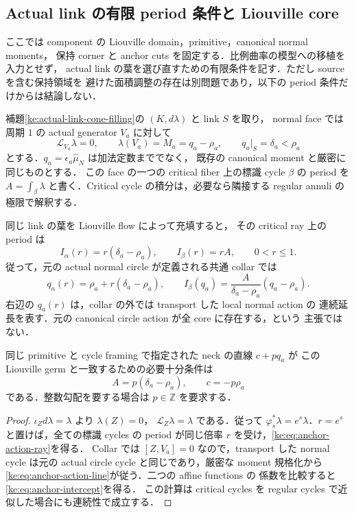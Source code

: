 \subsection{Actual link の有限 period 条件と Liouville core}

ここでは component の Liouville domain，primitive，canonical normal moments，
保持 corner と anchor cuts を固定する．比例曲率の模型への移植を入力とせず，
actual link の葉を選び直すための有限条件を記す．ただし source を含む保持領域を
避けた面積調整の存在は別問題であり，以下の period 条件だけからは結論しない．

\begin{lemma}
\label{ke:anchor-liouville-actions}
補題\ref{ke:actual-link-cone-filling}の $(K,d\lambda)$ と link $S$ を取り，
normal face では周期 $1$ の actual generator $V_a$ に対して
\[
 \mathcal L_{V_a}\lambda=0,\qquad
 \lambda(V_a)=M_a=q_a-\rho_a,\qquad q_a|_S=\delta_a<\rho_a
\]
とする．$q_a=\epsilon_a\widehat\mu_N$ は加法定数まででなく，
既存の canonical moment と厳密に同じものとする．
この face の一つの critical fiber 上の標識 cycle $\beta$ の period を
$A=\int_\beta\lambda$ と書く．Critical cycle の積分は，必要なら隣接する
regular annuli の極限で解釈する．

同じ link の葉を Liouville flow によって充填すると，
その critical ray 上の period は
\begin{equation}\label{ke:eq:anchor-action-ray}
 I_\alpha(r)=r(\delta_a-\rho_a),\qquad I_\beta(r)=rA,
 \qquad 0<r\le1.
\end{equation}
従って，元の actual normal circle が定義される共通 collar では
\begin{equation}\label{ke:eq:anchor-action-line}
 q_a(r)=\rho_a+r(\delta_a-\rho_a),\qquad
 I_\beta(q_a)=\frac{A}{\delta_a-\rho_a}(q_a-\rho_a).
\end{equation}
右辺の $q_a(r)$ は，collar の外では transport した local normal action の
連続延長を表す．元の canonical circle action が全 core に存在する，という
主張ではない．

同じ primitive と cycle framing で指定された neck の直線 $c+pq_a$ が
この Liouville germ と一致するための必要十分条件は
\begin{equation}\label{ke:eq:anchor-intercept}
 A=p(\delta_a-\rho_a),\qquad c=-p\rho_a
\end{equation}
である．整数勾配を要する場合は $p\in\mathbb Z$ を要求する．
\end{lemma}

\begin{proof}
$\iota_Zd\lambda=\lambda$ より $\lambda(Z)=0$，
$\mathcal L_Z\lambda=\lambda$ である．従って
$\varphi_s^*\lambda=e^s\lambda$．$r=e^s$ と置けば，全ての標識 cycles の
period が同じ倍率 $r$ を受け，\eqref{ke:eq:anchor-action-ray}を得る．
Collar では $[Z,V_a]=0$ なので，transport した normal cycle は元の actual
circle cycle と同じであり，厳密な moment 規格化から
\eqref{ke:eq:anchor-action-line}が従う．二つの affine functions の
係数を比較すると\eqref{ke:eq:anchor-intercept}を得る．
この計算は critical cycles を regular cycles で近似した場合にも連続性で成立する．
\end{proof}

